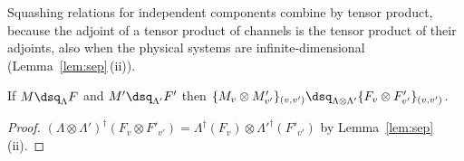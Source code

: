 
Squashing relations for independent components combine by tensor product,
because the adjoint of a tensor product of channels is the tensor product of
their adjoints, also when the physical systems are infinite-dimensional
(Lemma~\ref{lem:sep}\,(ii)).

\begin{proposition}\label{prop:tensor}
If $M\dsq_{\Lambda}F$ and $M'\dsq_{\Lambda'}F'$ then
$\{M_v\otimes M'_{v'}\}_{(v,v')}\dsq_{\Lambda\otimes\Lambda'}
\{F_v\otimes F'_{v'}\}_{(v,v')}$.
\end{proposition}

\begin{proof}
$(\Lambda\otimes\Lambda')^{\dagger}(F_v\otimes F'_{v'})
=\Lambda^{\dagger}(F_v)\otimes\Lambda'^{\dagger}(F'_{v'})$ by
Lemma~\ref{lem:sep}\,(ii).
\end{proof}
